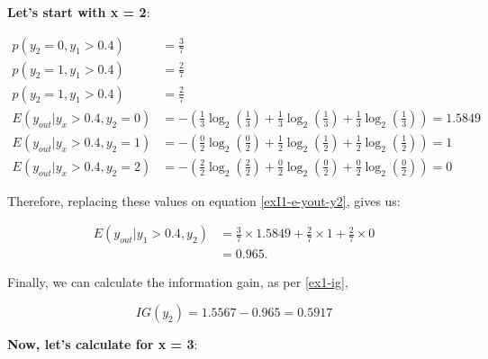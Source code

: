 \documentclass[12pt]{article}
\begin{document}
\begin{enumerate}[leftmargin=\labelsep]
    \textbf{Let's start with x = 2}:

    \[
        \begin{aligned}
            p(y_2 = 0, y_1 > 0.4)          & = \frac{3}{7}                                                                                               \\
            p(y_2 = 1, y_1 > 0.4)          & = \frac{2}{7}                                                                                              \\
            p(y_2 = 1, y_1 > 0.4)          & = \frac{2}{7}                                                                                              \\
            E(y_{out} | y_x > 0.4 , y_2 = 0) & = - \left(\frac{1}{3} \log_2\left(\frac{1}{3}\right) + \frac{1}{3} \log_2\left(\frac{1}{3}\right)
                + \frac{1}{3} \log_2\left(\frac{1}{3}\right)\right) = 1.5849                                                                   \\
            E(y_{out} | y_x > 0.4 , y_2 = 1) & = - \left(\frac{0}{2} \log_2\left(\frac{0}{2}\right) + \frac{1}{2} \log_2\left(\frac{1}{2}\right)
                + \frac{1}{2} \log_2\left(\frac{1}{2}\right)\right) = 1                                                                        \\
            E(y_{out} | y_x > 0.4 , y_2 = 2) & = - \left(\frac{2}{2} \log_2\left(\frac{2}{2}\right) + \frac{0}{2} \log_2\left(\frac{0}{2}\right)
                + \frac{0}{2} \log_2\left(\frac{0}{2}\right)\right) = 0
        \end{aligned}
    \]

    Therefore, replacing these values on equation \eqref{exI1-e-yout-y2}, gives us:

    \[
        \begin{aligned}
            E(y_{out} | y_1>0.4, y_2) & = \frac{3}{7} \times 1.5849 + \frac{2}{7} \times 1 +  \frac{2}{7} \times 0\\
                             & = 0.965.
        \end{aligned}
    \]

    Finally, we can calculate the information gain, as per \eqref{ex1-ig},

    \[
        IG(y_{2}) = 1.5567 - 0.965 = 0.5917
    \]

    \textbf{Now, let's calculate for x = 3}:


\end{enumerate}
\end{document}
